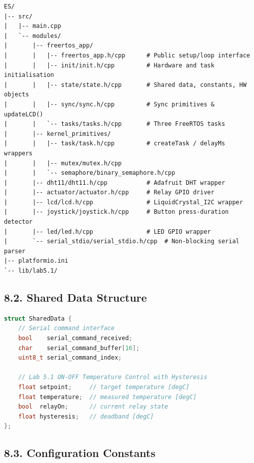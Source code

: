 \documentclass[12pt]{article}
\begin{document}
\begin{verbatim}
ES/
|-- src/
|   |-- main.cpp
|   `-- modules/
|       |-- freertos_app/
|       |   |-- freertos_app.h/cpp      # Public setup/loop interface
|       |   |-- init/init.h/cpp         # Hardware and task initialisation
|       |   |-- state/state.h/cpp       # Shared data, constants, HW objects
|       |   |-- sync/sync.h/cpp         # Sync primitives & updateLCD()
|       |   `-- tasks/tasks.h/cpp       # Three FreeRTOS tasks
|       |-- kernel_primitives/
|       |   |-- task/task.h/cpp         # createTask / delayMs wrappers
|       |   |-- mutex/mutex.h/cpp
|       |   `-- semaphore/binary_semaphore.h/cpp
|       |-- dht11/dht11.h/cpp           # Adafruit DHT wrapper
|       |-- actuator/actuator.h/cpp     # Relay GPIO driver
|       |-- lcd/lcd.h/cpp               # LiquidCrystal_I2C wrapper
|       |-- joystick/joystick.h/cpp     # Button press-duration detector
|       |-- led/led.h/cpp               # LED GPIO wrapper
|       `-- serial_stdio/serial_stdio.h/cpp  # Non-blocking serial parser
|-- platformio.ini
`-- lib/lab5.1/
\end{verbatim}

\subsection*{8.2. Shared Data Structure}

\begin{lstlisting}[language=C++, caption=Shared Data Structure (state.h)]
struct SharedData {
    // Serial command interface
    bool    serial_command_received;
    char    serial_command_buffer[16];
    uint8_t serial_command_index;

    // Lab 5.1 ON-OFF Temperature Control with Hysteresis
    float setpoint;     // target temperature [degC]
    float temperature;  // measured temperature [degC]
    bool  relayOn;      // current relay state
    float hysteresis;   // deadband [degC]
};
\end{lstlisting}

\subsection*{8.3. Configuration Constants}
\end{document}

